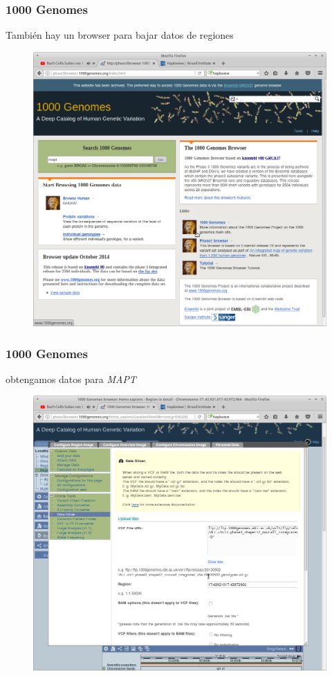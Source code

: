 \documentclass{beamer}\usepackage[]{graphicx}\usepackage[]{color}
\begin{document}
\begin{frame}[fragile]
\frametitle{1000 Genomes}
Tambi\'en hay un browser para bajar datos de regiones \begin{figure}[htbp]
\begin{center}
\includegraphics[width=.7\linewidth]{mapt.png}
\end{center}
\end{figure}

\end{frame}



\begin{frame}[fragile]
\frametitle{1000 Genomes}
obtengamos datos para \emph{MAPT}
\begin{figure}[htbp]
\begin{center}
\includegraphics[width=.7\linewidth]{getvcf.png}
\end{center}
\end{figure}
\end{frame}
\end{document}
